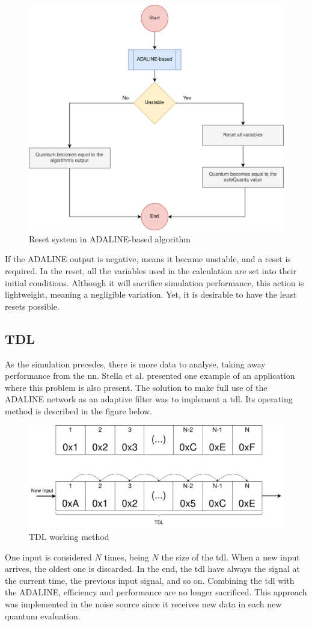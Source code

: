 \begin{figure}[H]
	\centering
 	\includegraphics[width=0.57\linewidth]{Images/ResetSystemADALINE.png}
 	\caption{Reset system in ADALINE-based algorithm}
	 \label{fig_ResetSystemADALINE}
\end{figure}

If the ADALINE output is negative, means it became unstable, and a reset is required. In the reset, all the variables used in the calculation are set 
into their initial conditions. Although it will sacrifice simulation performance, this action is lightweight, meaning a negligible variation. 
Yet, it is desirable to have the least resets possible.

\subsection{TDL}

As the simulation precedes, there is more data to analyse, taking away performance from the \gls{nn}. Stella et al. \cite{noiseCancelingADALINE} 
presented one example of an application where this problem is also present. The solution to make full use of the ADALINE network as an adaptive 
filter was to implement a \gls{tdl}. Its operating method is described in the figure below. 

\begin{figure}[H]
	\centering
 	\includegraphics[width=0.5\linewidth]{Images/TDL.png}
 	\caption{TDL working method}
	 \label{fig_TDL}
\end{figure}

One input is considered $N$ times, being $N$ the size of the \gls{tdl}. When a new input arrives, the oldest one is discarded. In the end, 
the \gls{tdl} have always the signal at the current time, the previous input signal, and so on. Combining the \gls{tdl} with the ADALINE, 
efficiency and performance are no longer sacrificed. This approach was implemented in the noise source since it receives new data in each new 
quantum evaluation. 

